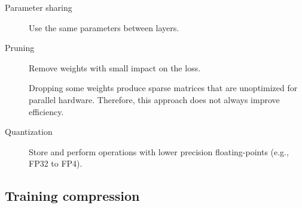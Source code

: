 \begin{description}
    \item[Parameter sharing] 
        Use the same parameters between layers.

    \item[Pruning] 
        Remove weights with small impact on the loss.

        \begin{remark}
            Dropping some weights produce sparse matrices that are unoptimized for parallel hardware. Therefore, this approach does not always improve efficiency.
        \end{remark}

    \item[Quantization] 
        Store and perform operations with lower precision floating-points (e.g., FP32 to FP4).
\end{description}


\subsection{Training compression}

